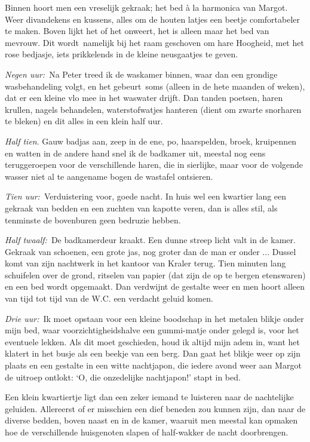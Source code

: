 \documentclass{book}
\begin{document}
Binnen hoort men een vreselijk gekraak; het bed à la harmonica van
Margot. Weer divandekens en kussens, alles om de houten latjes een
beetje comfortabeler te maken. Boven lijkt het of het onweert, het is
alleen maar het bed van mevrouw. Dit wordt~namelijk bij het raam
geschoven om hare Hoogheid, met het rose bedjasje, iets prikkelends in
de kleine neusgaatjes te geven.

\emph{Negen uur:}~Na Peter treed ik de waskamer binnen, waar dan een
grondige wasbehandeling volgt, en het gebeurt~soms (alleen in de hete
maanden of weken), dat er een kleine vlo mee in het waswater drijft. Dan
tanden poetsen, haren krullen, nagels behandelen, waterstofwatjes
hanteren (dient om zwarte snorharen te bleken) en dit alles in een klein
half uur.

\emph{Half tien}. Gauw badjas aan, zeep in de ene, po, haarspelden,
broek, kruipennen en watten in de andere hand snel ik de badkamer uit,
meestal nog eens teruggeroepen voor de verschillende haren, die in
sierlijke, maar voor de volgende wasser niet al te aangename bogen de
wastafel ontsieren.

\emph{Tien uur:}~Verduistering voor, goede nacht. In huis wel een
kwartier lang een gekraak van bedden en een zuchten van kapotte veren,
dan is alles stil, als tenminste de bovenburen geen bedruzie hebben.

\emph{Half twaalf:}~De badkamerdeur kraakt. Een dunne streep licht valt
in de kamer. Gekraak van schoenen, een grote jas, nog groter dan de man
er onder ... Dussel komt van zijn nachtwerk in het kantoor van Kraler
terug. Tien minuten lang schuifelen over de grond, ritselen van papier
(dat zijn de op te bergen etenswaren) en een bed wordt opgemaakt. Dan
verdwijnt de gestalte weer en men hoort alleen van tijd tot tijd van de
W.C. een verdacht geluid komen.

\emph{Drie uur:}~Ik moet opstaan voor een kleine boodschap in het
metalen blikje onder mijn bed, waar voorzichtigheidshalve een
gummi-matje onder gelegd is, voor het eventuele lekken. Als dit moet
geschieden, houd ik altijd mijn adem in, want het klatert in het busje
als een beekje van een berg. Dan gaat het blikje weer op zijn plaats en
een gestalte in een witte nachtjapon, die iedere avond weer aan Margot
de uitroep ontlokt: `O, die onzedelijke nachtjapon!' stapt in bed.

Een klein kwartiertje ligt dan een zeker iemand te luisteren naar de
nachtelijke geluiden. Allereerst of er misschien een dief beneden zou
kunnen zijn, dan naar de diverse bedden, boven naast en in de kamer,
waaruit men meestal kan opmaken hoe de verschillende huisgenoten slapen
of half-wakker de nacht doorbrengen.
\end{document}
